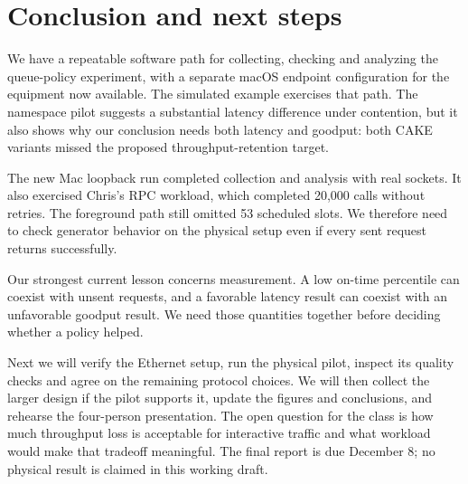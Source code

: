 \section{Conclusion and next steps}
We have a repeatable software path for collecting, checking and analyzing the
queue-policy experiment, with a separate macOS endpoint configuration for the
equipment now available. The simulated example exercises that path. The
namespace pilot suggests a substantial latency difference under contention,
but it also shows why our conclusion needs both latency and goodput: both
CAKE variants missed the proposed throughput-retention target.

The new Mac loopback run completed collection and analysis with real sockets.
It also exercised Chris's RPC workload, which completed 20,000 calls without
retries. The foreground path still omitted 53 scheduled slots. We therefore
need to check generator behavior on the physical setup even if every sent
request returns successfully.

Our strongest current lesson concerns measurement. A low on-time percentile
can coexist with unsent requests, and a favorable latency result can coexist
with an unfavorable goodput result. We need those quantities together before
deciding whether a policy helped.

Next we will verify the Ethernet setup, run the physical pilot, inspect its
quality checks and agree on the remaining protocol choices. We will then
collect the larger design if the pilot supports it, update the figures and
conclusions, and rehearse the four-person presentation. The open question for
the class is how much throughput loss is acceptable for interactive traffic
and what workload would make that tradeoff meaningful. The final report is
due December 8; no physical result is claimed in this working draft.
